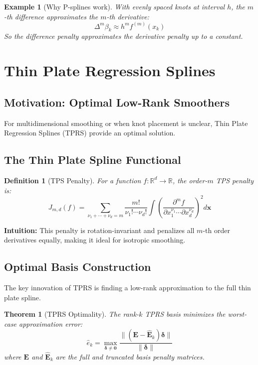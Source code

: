 \documentclass[12pt]{article}
\newtheorem{theorem}{Theorem}
\newtheorem{definition}{Definition}
\newtheorem{example}{Example}
\newcommand{\R}{\mathbb{R}}
\begin{document}
\begin{example}[Why P-splines work]
With evenly spaced knots at interval $h$, the $m$-th difference approximates the $m$-th derivative:
\begin{equation}
\Delta^m \beta_k \approx h^m f^{(m)}(x_k)
\end{equation}
So the difference penalty approximates the derivative penalty up to a constant.
\end{example}

\section{Thin Plate Regression Splines}

\subsection{Motivation: Optimal Low-Rank Smoothers}

For multidimensional smoothing or when knot placement is unclear, Thin Plate Regression Splines (TPRS) provide an optimal solution.

\subsection{The Thin Plate Spline Functional}

\begin{definition}[TPS Penalty]
For a function $f: \R^d \to \R$, the order-$m$ TPS penalty is:
\begin{equation}
J_{m,d}(f) = \sum_{\nu_1+\cdots+\nu_d = m} \frac{m!}{\nu_1! \cdots \nu_d!} \int \left( \frac{\partial^m f}{\partial x_1^{\nu_1} \cdots \partial x_d^{\nu_d}} \right)^2 d\mathbf{x}
\end{equation}
\end{definition}

\textbf{Intuition:} This penalty is rotation-invariant and penalizes all $m$-th order derivatives equally, making it ideal for isotropic smoothing.

\subsection{Optimal Basis Construction}

The key innovation of TPRS is finding a low-rank approximation to the full thin plate spline.

\begin{theorem}[TPRS Optimality]
The rank-$k$ TPRS basis minimizes the worst-case approximation error:
\begin{equation}
\hat{e}_k = \max_{\bm{\delta} \neq \mathbf{0}} \frac{\|(\mathbf{E} - \hat{\mathbf{E}}_k)\bm{\delta}\|}{\|\bm{\delta}\|}
\end{equation}
where $\mathbf{E}$ and $\hat{\mathbf{E}}_k$ are the full and truncated basis penalty matrices.
\end{theorem}
\end{document}
